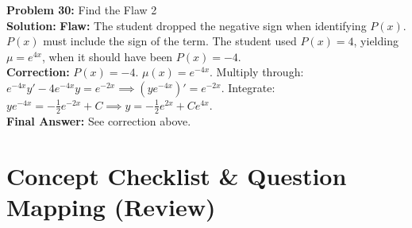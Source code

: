 \documentclass[11pt]{article}
\begin{document}
\vspace{10pt}
\textbf{Problem 30:} Find the Flaw 2 \\
\textbf{Solution:} 
\textbf{Flaw:} The student dropped the negative sign when identifying $P(x)$. $P(x)$ must include the sign of the term. The student used $P(x) = 4$, yielding $\mu = e^{4x}$, when it should have been $P(x) = -4$. \\
\textbf{Correction:} $P(x) = -4$. $\mu(x) = e^{-4x}$. Multiply through: $e^{-4x}y' - 4e^{-4x}y = e^{-2x} \implies (ye^{-4x})' = e^{-2x}$. Integrate: $ye^{-4x} = -\frac{1}{2}e^{-2x} + C \implies y = -\frac{1}{2}e^{2x} + Ce^{4x}$. \\
\textbf{Final Answer:} See correction above.

\newpage

\section{Concept Checklist \& Question Mapping (Review)}
\end{document}
